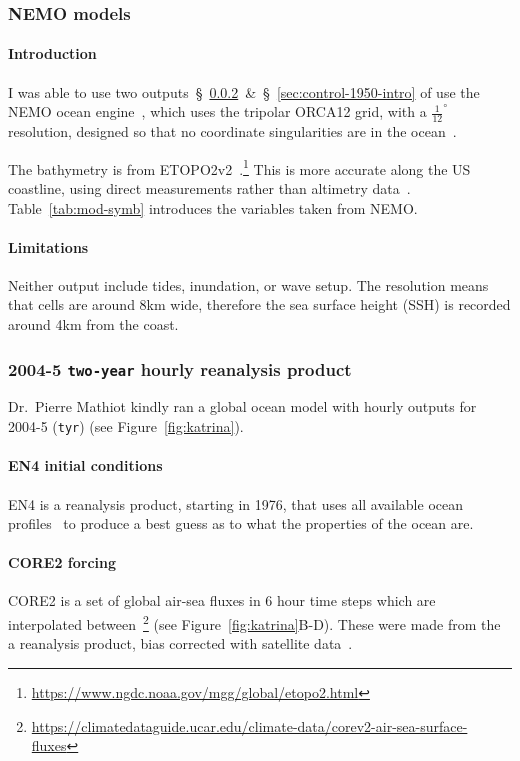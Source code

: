 \subsubsection{NEMO models}
\paragraph{Introduction}
\label{sec:nemo}
I was able to use two outputs~§~\ref{sec:rean-prod}~\&~§~\ref{sec:control-1950-intro}
of use the NEMO ocean engine~\cite{madec2015nemo}, which uses the tripolar ORCA12 grid,
with a  $\frac{1}{12}^{\circ}$
resolution, designed so that no coordinate singularities are in the ocean~\cite{madec1996global}.


 The bathymetry is from
 ETOPO2v2~\cite{lecointre2011definition, noaa20062}.\footnote{\url{https://www.ngdc.noaa.gov/mgg/global/etopo2.html}}
 This is more accurate along the US coastline, using
 direct measurements rather than altimetry data~\cite{noaa20062}.
 Table~\ref{tab:mod-symb} introduces the variables taken from NEMO.



\paragraph{Limitations}

Neither output
include tides, inundation, or wave setup.
The resolution means that cells are around
8km wide, therefore the sea surface height (SSH)
is recorded around 4km from the coast.

\subsubsection{2004-5 \texttt{two-year} hourly reanalysis product}
\label{sec:rean-prod}
Dr.~Pierre Mathiot kindly ran a global ocean model with
hourly outputs for 2004-5 (\texttt{tyr}) (see Figure~\ref{fig:katrina}).

\paragraph{EN4 initial conditions}
EN4 is a reanalysis product, starting in 1976,
 that uses all available ocean profiles~\cite{good2013en4, HadObs}
to produce a best guess as to what the properties of the ocean are.


\paragraph{CORE2 forcing}
CORE2 is a set of global air-sea fluxes in 6 hour time steps which are interpolated between~\cite{griffies2012datasets,large2009global,
 hurrell2008new}\footnote{\url{https://climatedataguide.ucar.edu/climate-data/corev2-air-sea-surface-fluxes}}
 (see Figure~\ref{fig:katrina}B-D).
 These were made from the a reanalysis product,
 bias corrected with satellite data~\cite{core2, core2expert}.


